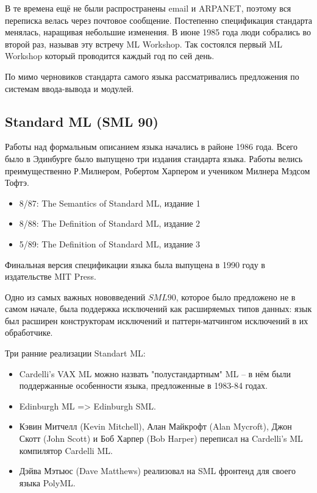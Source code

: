 \documentclass[14pt]{matmex-diploma-custom}
\begin{document}
В те времена ещё не были распространены email и ARPANET, поэтому вся переписка велась через почтовое сообщение. Постепенно спецификация стандарта менялась, наращивая небольшие изменения. В июне 1985 года люди собрались во второй раз, называв эту встречу ML Workshop. Так состоялся первый ML Workshop который проводится каждый год по сей день.

По мимо черновиков стандарта самого языка рассматривались предложения по системам ввода-вывода и модулей.





\subsection{Standard ML (SML 90)}
Работы над формальным описанием языка начались в районе 1986 года. Всего было в Эдинбурге было выпущено три издания стандарта языка. Работы велись преимущественно Р.Милнером, Робертом Харпером и учеником Милнера Мэдсом Тофтэ.
\begin{itemize}
\item 8/87: The Semantics of Standard ML, издание 1
\item 8/88: The Definition of Standard ML, издание 2
\item 5/89: The Definition of Standard ML, издание 3
\end{itemize}
Финальная версия спецификации языка была выпущена в 1990 году в издательстве MIT Press.

Одно из самых важных нововведений $SML 90$, которое было предложено не в самом начале, была поддержка исключений как расширяемых типов данных: язык был расширен конструкторам исключений и паттерн-матчингом исключений в их обработчике. 

Три ранние реализации Standart ML:
\begin{itemize}
\item Cardelli’s VAX ML можно назвать "полустандартным" ML -- в нём были поддержанные особенности языка, предложенные в 1983-84 годах.
\item Edinburgh ML => Edinburgh SML.
\item Кэвин Митчелл (Kevin Mitchell), Алан Майкрофт (Alan Mycroft), Джон Скотт (John Scott) и Боб Харпер (Bob Harper) переписал на  Cardelli’s ML компилятор Cardelli ML.
\item Дэйва Мэтьюс (Dave Matthews) реализовал на SML фронтенд для своего языка PolyML.
\end{itemize}
\end{document}
